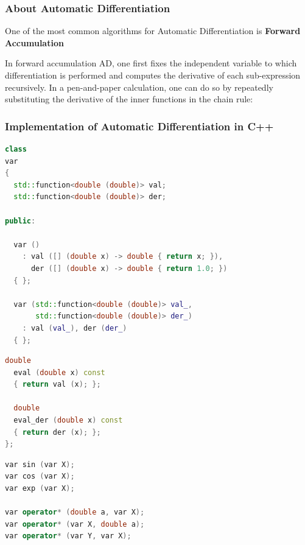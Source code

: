 \documentclass[smaller,a4paper,allowframebreaks]{beamer}
\begin{document}
\begin{frame}
\frametitle{About Automatic Differentiation}

One of the most common algorithms for Automatic Differentiation is \textbf{Forward Accumulation}

In forward accumulation AD, one first fixes the independent variable to which differentiation is performed and computes the derivative of each sub-expression recursively. In a pen-and-paper calculation, one can do so by repeatedly substituting the derivative of the inner functions in the chain rule:


\end{frame}

\begin{frame}
\frametitle{Implementation of Automatic Differentiation in C++}

\begin{lstlisting}[language=C++]
class
var
{
  std::function<double (double)> val;
  std::function<double (double)> der; 

public:

  var ()
    : val ([] (double x) -> double { return x; }),
      der ([] (double x) -> double { return 1.0; })
  { };

  var (std::function<double (double)> val_,
       std::function<double (double)> der_)
    : val (val_), der (der_)
  { };
\end{lstlisting}

\begin{lstlisting}[language=C++]
  double
  eval (double x) const
  { return val (x); };

  double
  eval_der (double x) const
  { return der (x); };  
};
\end{lstlisting}

\begin{lstlisting}[language=C++]
var sin (var X);
var cos (var X);
var exp (var X);

var operator* (double a, var X);
var operator* (var X, double a);
var operator* (var Y, var X);

\end{lstlisting}
\end{frame}
\end{document}
